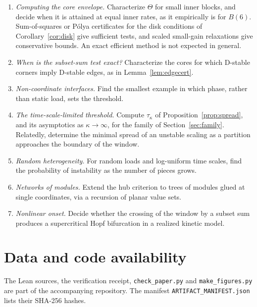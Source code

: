 \documentclass[11pt,a4paper]{article}
\theoremstyle{plain}
\theoremstyle{definition}
\theoremstyle{remark}
\newcommand{\Core}{\Theta}
\begin{document}
\begin{enumerate}[leftmargin=1.6em]
\item \emph{Computing the core envelope.} Characterize $\Core$ for small inner
blocks, and decide when it is attained at equal inner rates, as it
empirically is for $B(6)$. Sum-of-squares or P{\'o}lya certificates for the disk
conditions of Corollary~\ref{cor:disk} give sufficient tests, and scaled
small-gain relaxations give conservative bounds. An exact efficient method is
not expected in general.
\item \emph{When is the subset-sum test exact?} Characterize the cores for
which D-stable corners imply D-stable edges, as in
Lemma~\ref{lem:edgecert}.
\item \emph{Non-coordinate interfaces.} Find the smallest example in which
phase, rather than static load, sets the threshold.
\item \emph{The time-scale-limited threshold.} Compute $\tau_\kappa$ of
Proposition~\ref{prop:spread}, and its asymptotics as $\kappa\to\infty$, for
the family of Section~\ref{sec:family}. Relatedly, determine the minimal
spread of an unstable scaling as a partition approaches the boundary of the
window.
\item \emph{Random heterogeneity.} For random loads and log-uniform time
scales, find the probability of instability as the number of pieces grows.
\item \emph{Networks of modules.} Extend the hub criterion to trees of modules
glued at single coordinates, via a recursion of planar value sets.
\item \emph{Nonlinear onset.} Decide whether the crossing of the window by a
subset sum produces a supercritical Hopf bifurcation in a realized kinetic
model.
\end{enumerate}

\section*{Data and code availability}
The Lean sources, the verification receipt, \texttt{check\_paper.py} and
\texttt{make\_figures.py} are part of the accompanying repository. The
manifest \texttt{ARTIFACT\_MANIFEST.json} lists their SHA-256 hashes.



\end{document}
